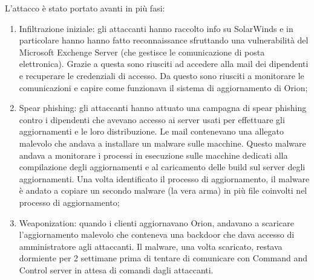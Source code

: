 \noindent L'attacco è stato portato avanti in più fasi:
\begin{enumerate}
    \item Infiltrazione iniziale: gli attaccanti hanno raccolto info su SolarWinds e in particolare hanno hanno fatto reconnaissance sfruttando una vulnerabilità del Microsoft Exchenge Server (che gestisce le comunicazione di posta elettronica). Grazie a questa sono riusciti ad accedere alla mail dei dipendenti e recuperare le credenziali di accesso. Da questo sono riusciti a monitorare le comunicazioni e capire come funzionava il sistema di aggiornamento di Orion;
    \item Spear phishing: gli attaccanti hanno attuato una campagna di spear phishing contro i dipendenti che avevano accesso ai server usati per effettuare gli aggiornamenti e le loro distribuzione. Le mail contenevano una allegato malevolo che andava a installare un malware sulle macchine. Questo malware andava a monitorare i processi in esecuzione sulle macchine dedicati alla compilazione degli aggiornamenti e al caricamento delle build sul server degli aggiornamenti. Una volta identificato il processo di aggiornamento, il malware è andato a copiare un secondo malware (la vera arma) in più file coinvolti nel processo di aggiornamento;
    \item Weaponization: quando i clienti aggiornavano Orion, andavano a scaricare l'aggiornamento malevolo che conteneva una backdoor che dava accesso di amministratore agli attaccanti. Il malware, una volta scaricato, restava dormiente per 2 settimane prima di tentare di comunicare con Command and Control server in attesa di comandi dagli attaccanti. 
\end{enumerate}









